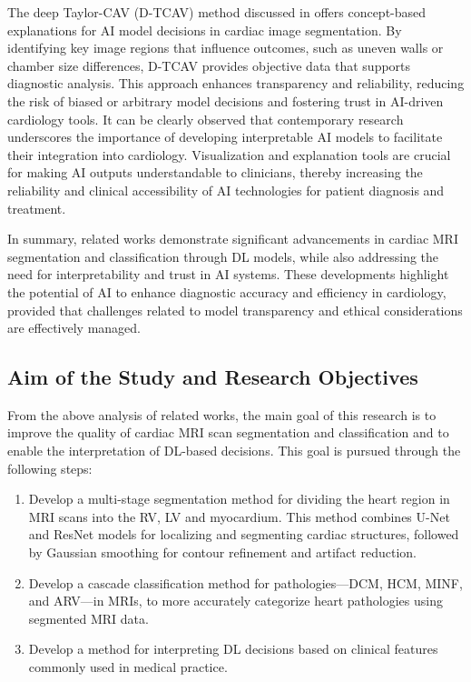 \documentclass[fleqn,10pt]{wlscirep}
\begin{document}
The deep Taylor-CAV (D-TCAV) method discussed in \cite{Janik:2021} offers concept-based explanations for AI model decisions in cardiac image segmentation. By identifying key image regions that influence outcomes, such as uneven walls or chamber size differences, D-TCAV provides objective data that supports diagnostic analysis. This approach enhances transparency and reliability, reducing the risk of biased or arbitrary model decisions and fostering trust in AI-driven cardiology tools. It can be clearly observed that contemporary research underscores the importance of developing interpretable AI models to facilitate their integration into cardiology. Visualization and explanation tools are crucial for making AI outputs understandable to clinicians, thereby increasing the reliability and clinical accessibility of AI technologies for patient diagnosis and treatment.

In summary, related works demonstrate significant advancements in cardiac MRI segmentation and classification through DL models, while also addressing the need for interpretability and trust in AI systems. These developments highlight the potential of AI to enhance diagnostic accuracy and efficiency in cardiology, provided that challenges related to model transparency and ethical considerations are effectively managed.

\subsection*{Aim of the Study and Research Objectives}

From the above analysis of related works, the main goal of this research is to improve the quality of cardiac MRI scan segmentation and classification and to enable the interpretation of DL-based decisions. This goal is pursued through the following steps:

\begin{enumerate}
    \item Develop a multi-stage segmentation method for dividing the heart region in MRI scans into the RV, LV and myocardium. This method combines U-Net and ResNet models for localizing and segmenting cardiac structures, followed by Gaussian smoothing for contour refinement and artifact reduction.
    \item Develop a cascade classification method for pathologies---DCM, HCM, MINF, and ARV---in MRIs, to more accurately categorize heart pathologies using segmented MRI data.
    \item Develop a method for interpreting DL decisions based on clinical features commonly used in medical practice.
\end{enumerate}
\end{document}
